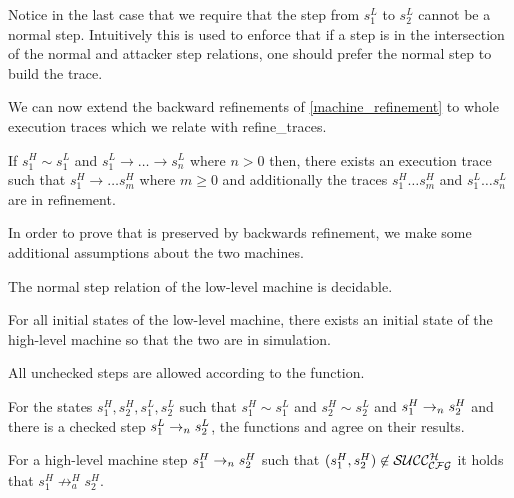 Notice in the last case that we require that the step from $s^L_1$ to
$s^L_2$ cannot be a normal step. Intuitively this is used to enforce
that if a step is in the intersection of the normal and attacker step
relations, one should prefer the normal step to build the trace.

We can now extend the backward refinements of \cref{machine_refinement}
to whole execution traces which we relate with refine\_traces.

\begin{theorem}
  \label{backward_refinement_traces}
  If $s^H_1 \sim s^L_1$ and $s^L_1 \to \ldots \to s^L_n$ where $n > 0$ then,
  there exists an execution trace such that $s^H_1 \to \ldots s^H_m$ where
  $m \geq 0$ and additionally the traces $s^H_1 \ldots s^H_m$ and
  $s^L_1 \ldots s^L_n$ are in refinement.
\end{theorem}

In order to prove that \CFI is preserved by backwards refinement, we
make some additional assumptions about the two machines.

\begin{definition}
\label{step_classic}
The normal step relation of the low-level machine is decidable.
\end{definition}

\begin{definition}
\label{initial_refine}
For all initial states of the low-level machine, there exists an
initial state of the high-level machine so that the two are in
simulation.
\end{definition}

\begin{definition}
\label{cfg_nocheck}
All unchecked steps are allowed according to the \SUCC{} function.
\end{definition}

\begin{definition}
\label{cfg_equiv}
For the states $s^{H}_1, s^{H}_2, s^L_1, s^{L}_2$ such that $s^{H}_1
\sim s^{L}_1$ and $s^H_2 \sim s^L_2$ and $s^{H}_1\to_ns^H_2$ and
there is a checked step $s^{L}_1\to_ns^L_2$, the functions
 and  agree on their results.
\end{definition}

\begin{definition}
\label{av_no_attacker}
For a high-level machine step $s^H_1\to_ns^H_2$ such that
$(s^H_1,s^H_2) \not \in \mathcal{SUCC_\mathcal{CFG}^{H}}$ it holds that $s^H_1 \not \to^H_a
s^H_2$.
\end{definition}


